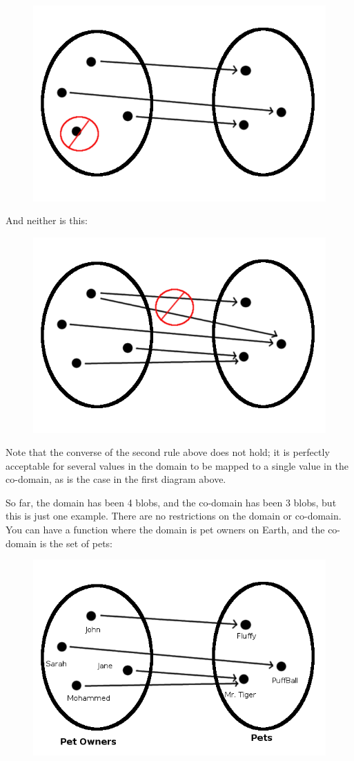 \documentclass[UTF8]{book}
\begin{document}
\begin{CJK}{UTF8}{gbsn}
\begin{figure}[H]
\centering
\includegraphics[width=0.8\linewidth]{function_undefined}
\end{figure}

And neither is this:

\begin{figure}[H]
\centering
\includegraphics[width=0.8\linewidth]{function_multifunction}
\end{figure}

Note that the converse of the second rule above does not hold; it is perfectly acceptable for several values in the domain to be mapped to a single value in the co-domain, as is the case in the first diagram above.

So far, the domain has been 4 blobs, and the co-domain has been 3 blobs, but this is just one example. There are no restrictions on the domain or co-domain. You can have a function where the domain is pet owners on Earth, and the co-domain is the set of pets:

\begin{figure}[H]
\centering
\includegraphics[width=0.8\linewidth]{function_pets}
\end{figure}


\end{CJK}
\end{document}
